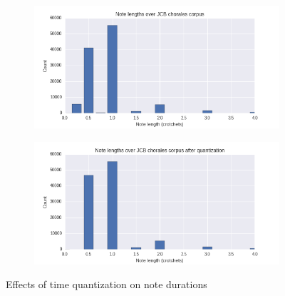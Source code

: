 \documentclass[dissertation.tex]{subfiles}
\begin{document}
\begin{figure}[htpb]
    \centering
    \begin{subfigure}[t]{0.48\textwidth}
        \centering
        \includegraphics[width=1.0\linewidth]{Figures/note-lengths-original.png}
    \end{subfigure}
    \begin{subfigure}[t]{0.48\textwidth}
        \centering
        \includegraphics[width=1.0\linewidth]{Figures/note-lengths-quantized.png}
    \end{subfigure}
    \caption{Effects of time quantization on note durations}
    \label{fig:note-lengths-time-quantization}
\end{figure}
\end{document}
